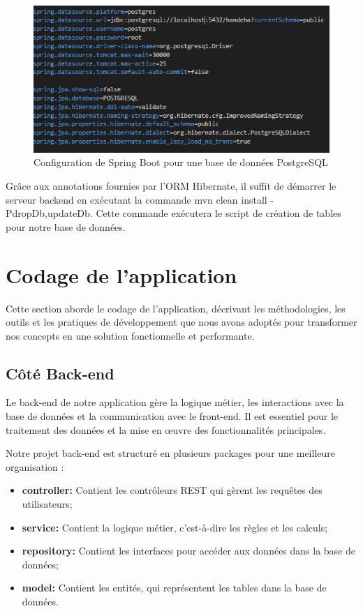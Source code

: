 \documentclass[12pt]{report}
\begin{document}
			\begin{figure}[h]
				\centering
				\includegraphics[width=\textwidth]{appPropPostgre.jpg}
				\caption{Configuration de Spring Boot pour une base de données PostgreSQL}
				\label{fig:appPropPostgre}
			\end{figure}
			\FloatBarrier

			Grâce aux annotations fournies par l'ORM Hibernate, il suffit de démarrer le serveur backend en exécutant la commande mvn clean install -PdropDb,updateDb. Cette commande exécutera le script de création de tables pour notre base de données.


			\section{Codage de l’application}

			\hspace{15pt} Cette section aborde le codage de l'application, décrivant les méthodologies, les outils et les pratiques de développement que nous avons adoptés pour transformer nos concepts en une solution fonctionnelle et performante.

			\subsection{Côté Back-end}
			
			\hspace{15pt} Le back-end de notre application gère la logique métier, les interactions avec la base de données et la communication avec le front-end. Il est essentiel pour le traitement des données et la mise en œuvre des fonctionnalités principales.

			Notre projet back-end est structuré en plusieurs packages pour une meilleure organisation :

			\begin{itemize}
				\item \textbf{controller:} Contient les contrôleurs REST qui gèrent les requêtes des utilisateurs;
				\item \textbf{service:} Contient la logique métier, c'est-à-dire les règles et les calculs;
				\item \textbf{repository:} Contient les interfaces pour accéder aux données dans la base de données;
				\item \textbf{model:} Contient les entités, qui représentent les tables dans la base de données.
			\end{itemize}
\end{document}
